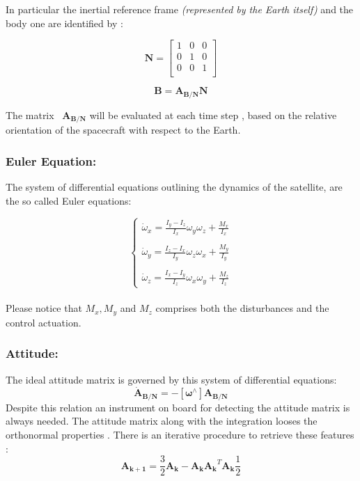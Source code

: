 \documentclass[11pt]{article}
\begin{document}
In particular the inertial reference frame \textit{(represented by the Earth itself)} and the body one are identified by :\\
\begin{minipage}{.5\textwidth}
\begin{equation}
\mathbf{N}=\begin{bmatrix}
1 & 0 & 0 \\
0& 1 & 0 \\
0 & 0 & 1 \\
\end{bmatrix}
\end{equation}
\end{minipage}
\begin{minipage}{.5\textwidth}
\begin{equation}
\mathbf{B}=\mathbf{A_{B/N}}\mathbf{N}
\end{equation}
\end{minipage}
The matrix  \ $ \mathbf{A_{B/N}}$ will be evaluated at each time step , based on the relative orientation of the spacecraft  with respect to the Earth.

\subsubsection{Euler Equation:}
The system of differential equations outlining the dynamics of the satellite, are the so called Euler equations:

\begin{equation}
\begin{cases}
\dot{\omega}_x=\displaystyle\frac{I_y-I_z}{I_x}\omega_y \omega_z + \displaystyle\frac{M_x}{I_x} \\\\
\dot{\omega}_y=\displaystyle\frac{I_z-I_x}{I_y}\omega_z \omega_x + \displaystyle\frac{M_y}{I_y} \\\\
\dot{\omega}_z=\displaystyle\frac{I_x-I_y}{I_z}\omega_x \omega_y + \displaystyle\frac{M_z}{I_z} 
\end{cases}
\end{equation}
\\ Please notice that $ M_x,M_y$ and $ M_z$ comprises both the disturbances and the control actuation.
\subsubsection{Attitude:}
The ideal attitude matrix is governed by this  system of differential equations:
\begin{equation}
\mathbf{\dot{A}_{B/N}}=-[\boldsymbol{\omega}^\wedge ]\mathbf{{A}_{B/N}}
\end{equation}
Despite this relation an instrument on board for detecting the attitude matrix is always needed.
The attitude matrix along with the integration looses the orthonormal properties  . There is an iterative procedure to retrieve these features :
\begin{equation}
\mathbf{A_{k+1}}=\frac{3}{2}\mathbf{A_k}-\mathbf{A_k}\mathbf{A_k}^T\mathbf{A_k}\frac{1}{2}
\end{equation}
\end{document}
